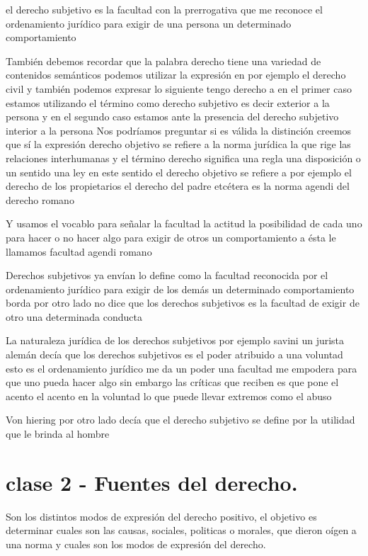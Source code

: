 \documentclass[12pt]{book}
\begin{document}
el derecho subjetivo es la facultad con la prerrogativa que me reconoce el ordenamiento jurídico para exigir de una persona un determinado comportamiento

También debemos recordar que la palabra derecho tiene una variedad de contenidos semánticos podemos utilizar la expresión en por ejemplo el derecho civil y también podemos expresar lo siguiente tengo derecho a en el primer caso estamos utilizando el término como derecho subjetivo es decir exterior a la persona y en el segundo caso estamos ante la presencia del derecho subjetivo interior a la persona
Nos podríamos preguntar si es válida la distinción creemos que sí la expresión derecho objetivo se refiere a la norma jurídica la que rige las relaciones interhumanas y el término derecho significa una regla una disposición o un sentido una ley en este sentido el derecho objetivo se refiere a por ejemplo el derecho de los propietarios el derecho del padre etcétera es la norma agendi del derecho romano

Y usamos el vocablo para señalar la facultad la actitud la posibilidad de cada uno para hacer o no hacer algo para exigir de otros un comportamiento a ésta le llamamos facultad agendi romano

Derechos subjetivos
ya envían lo define como la facultad reconocida por el ordenamiento jurídico para exigir de los demás un determinado comportamiento borda por otro lado no dice que los derechos subjetivos es la facultad de exigir de otro una determinada conducta

La naturaleza jurídica de los derechos subjetivos por ejemplo savini un jurista alemán  decía que los derechos subjetivos es el poder atribuido a una voluntad esto es el ordenamiento jurídico me da un poder una facultad me empodera para que uno pueda hacer algo sin embargo las críticas que reciben es que pone el acento el acento en la voluntad lo que puede llevar extremos como el abuso

Von hiering por otro lado decía que el derecho subjetivo se define por la utilidad que le brinda al hombre



\chapter{clase 2 - Fuentes del derecho.}
Son los distintos modos de expresi\'on	del derecho positivo, el objetivo es determinar cuales son las causas, sociales, politicas o morales, que dieron o\'igen a una norma y cuales son los modos de expresi\'on del derecho.
\end{document}
